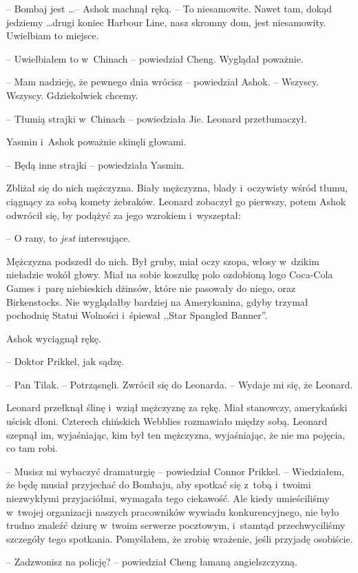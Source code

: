 \documentclass[oneside,polish,11pt,rmheadings]{mwbk}
\begin{document}
-- Bombaj jest \ldots  -- Ashok machnął ręką. -- To niesamowite. Nawet tam, dokąd jedziemy  \ldots  drugi koniec Harbour Line, nasz skromny dom, jest niesamowity. Uwielbiam to miejsce.

-- Uwielbiałem to w~Chinach -- powiedział Cheng. Wyglądał poważnie.

-- Mam nadzieję, że pewnego dnia wrócisz -- powiedział Ashok. -- Wszyscy. Wszyscy. Gdziekolwiek chcemy. 

-- Tłumią strajki w~Chinach -- powiedziała Jie. Leonard przetłumaczył.

Yasmin i~Ashok poważnie skinęli głowami. 

-- Będą inne strajki -- powiedziała Yasmin.

Zbliżał się do nich mężczyzna. Biały mężczyzna, blady i~oczywisty wśród tłumu, ciągnący za sobą komety żebraków. Leonard zobaczył go pierwszy, potem Ashok odwrócił się, by podążyć za jego wzrokiem i~wyszeptał: 

-- O rany, to \textit{jest }interesujące.

Mężczyzna podszedł do nich. Był gruby, miał oczy szopa, włosy w~dzikim nieładzie wokół głowy. Miał na sobie koszulkę polo ozdobioną logo Coca-Cola Games i~parę niebieskich dżinsów, które nie pasowały do niego, oraz Birkenstocks. Nie wyglądałby bardziej na Amerykanina, gdyby trzymał pochodnię Statui Wolności i~śpiewał ,,Star Spangled Banner''.

Ashok wyciągnął rękę. 

-- Doktor Prikkel, jak sądzę.

-- Pan Tilak. -- Potrząsnęli. Zwrócił się do Leonarda. -- Wydaje mi się, że Leonard.

Leonard przełknął ślinę i~wziął mężczyznę za rękę. Miał stanowczy, amerykański uścisk dłoni. Czterech chińskich Webblies rozmawiało między sobą. Leonard szepnął im, wyjaśniając, kim był ten mężczyzna, wyjaśniając, że nie ma pojęcia, co tam robi.

-- Musisz mi wybaczyć dramaturgię -- powiedział Connor Prikkel. -- Wiedziałem, że będę musiał przyjechać do Bombaju, aby spotkać się z~tobą i~twoimi niezwykłymi przyjaciółmi, wymagała tego ciekawość. Ale kiedy umieściliśmy w~twojej organizacji naszych pracowników wywiadu konkurencyjnego, nie było trudno znaleźć dziurę w~twoim serwerze pocztowym, i~stamtąd przechwyciliśmy szczegóły tego spotkania. Pomyślałem, że zrobię wrażenie, jeśli przyjadę osobiście.

-- Zadzwonisz na policję? -- powiedział Cheng łamaną angielszczyzną.
\end{document}
